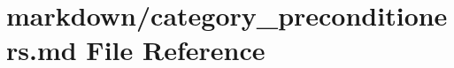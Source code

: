 \hypertarget{category__preconditioners_8md}{}\section{markdown/category\+\_\+preconditioners.md File Reference}
\label{category__preconditioners_8md}
